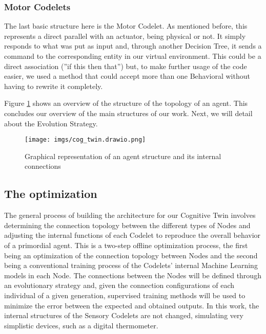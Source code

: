  \subsubsection{Motor Codelets}
 The last basic structure here is the Motor Codelet. As mentioned before, this represents a direct parallel with an actuator, being physical or not. It simply responds to what was put as input and, through another Decision Tree, it sends a command to the corresponding entity in our virtual environment. This could be a direct association (''if this then that'') but, to make further usage of the code easier, we used a method that could accept more than one Behavioral without having to rewrite it completely.
 
 
 Figure \ref{fig:agent_struct} shows an overview of the structure of the topology of an agent. This concludes our overview of the main structures of our work. Next, we will detail about the Evolution Strategy.


  \begin{figure}[ht]
\centering
	\texttt{[image: imgs/cog\_twin.drawio.png]}
\caption{Graphical representation of an agent structure and its internal connections}
\label{fig:agent_struct}
\end{figure}

\subsection{The optimization}

The general process of building the architecture for our Cognitive Twin involves determining the connection topology between the different types of Nodes and adjusting the internal functions of each Codelet to reproduce the overall behavior of a primordial agent. This is a two-step offline optimization process, the first being an optimization of the connection topology between Nodes and the second being a conventional training process of the Codelets' internal Machine Learning models in each Node. The connections between the Nodes will be defined through an evolutionary strategy and, given the connection configurations of each individual of a given generation, supervised training methods will be used to minimize the error between the expected and obtained outputs.
In this work, the internal structures of the Sensory Codelets are not changed, simulating very simplistic devices, such as a digital thermometer. 


